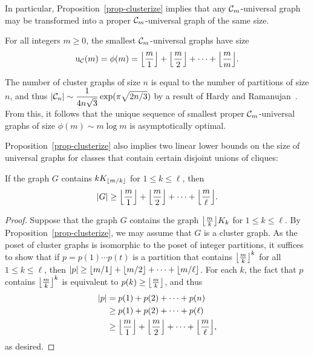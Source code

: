 In particular, Proposition~\ref{prop-clusterize} implies that any $\mathcal{C}_m$-universal graph may be transformed into a proper $\mathcal{C}_m$-universal graph of the same size.
\begin{corollary}
\label{cor-graph-cluster-improper}
For all integers $m \ge 0$, the smallest $\mathcal{C}_m$-universal graphs have size
\[
	\operatorname{u}_{\mathcal{C}}(m)
	=
	\phi(m)
	=
	{\left\lfloor{\dfrac{m}{1}}\right\rfloor} + {\left\lfloor{\dfrac{m}{2}}\right\rfloor} + \cdots + {\left\lfloor{\dfrac{m}{m}}\right\rfloor}.
\]
\end{corollary}

The number of cluster graphs of size $n$ is equal to the number of partitions of size $n$, and thus $\left\lvert{ \mathcal{C}_n}\right\rvert \sim \dfrac{1}{4n\sqrt{3}} \exp(\pi \sqrt{2n/3})$ by a result of Hardy and Ramanujan~\cite{hardy:asymptotic-formulae:}. From this, it follows that the unique sequence of smallest proper $\mathcal{C}_m$-universal graphs of size $\phi(m) \sim m \log m$ is asymptotically optimal. 

Proposition~\ref{prop-clusterize} also implies two linear lower bounds on the size of universal graphs for classes that contain certain disjoint unions of cliques:
\begin{corollary}
\label{cor-graph-lower-big-cliques}
	If the graph $G$ contains $k K_{{\left\lfloor{m/k}\right\rfloor}}$ for $1 \le k \le \ell$, then
	\[
		\left\lvert{G}\right\rvert
		\ge
		{\left\lfloor{\dfrac{m}{1}}\right\rfloor} + {\left\lfloor{\dfrac{m}{2}}\right\rfloor} + \cdots + {\left\lfloor{\dfrac{m}{\ell}}\right\rfloor}.
	\]
\end{corollary}
\begin{proof}
	Suppose that the graph $G$ contains the graph ${\left\lfloor{\frac{m}{k}}\right\rfloor} K_{k}$ for $1 \le k \le \ell$. By Proposition~\ref{prop-clusterize}, we may assume that $G$ is a cluster graph. As the poset of cluster graphs is isomorphic to the poset of integer partitions, it suffices to show that if $p = p(1) \cdots p(t)$ is a partition that contains ${\left\lfloor{\frac{m}{k}}\right\rfloor}^k$ for all $1 \le k \le \ell$, then $\left\lvert{p}\right\rvert \ge {\left\lfloor{m/1}\right\rfloor} + {\left\lfloor{m/2}\right\rfloor} + \cdots + {\left\lfloor{m/\ell}\right\rfloor}$. For each $k$, the fact that $p$ contains ${\left\lfloor{\frac{m}{k}}\right\rfloor}^k$ is equivalent to $p(k) \ge {\left\lfloor{\frac{m}{k}}\right\rfloor}$, and thus
	\begin{align*}
		\left\lvert{p}\right\rvert
			&= p(1) + p(2) + \cdots + p(n) \\
			&\ge p(1) + p(2) + \cdots + p(\ell) \\
			&\ge {\left\lfloor{\dfrac{m}{1}}\right\rfloor} + {\left\lfloor{\dfrac{m}{2}}\right\rfloor} + \cdots + {\left\lfloor{\dfrac{m}{\ell}}\right\rfloor},
	\end{align*}
	as desired.
\end{proof}


